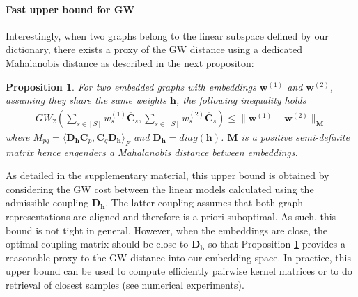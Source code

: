 \documentclass{article}
\newcommand{\scalar}[2]{\langle #1 , #2 \rangle}
\def\vh{{\bm{h}}}
\def\vw{{\bm{w}}}
\def\mC{{\bm{C}}}
\def\mD{{\bm{D}}}
\def\mM{{\bm{M}}}
\newtheorem{proposition}{Proposition}
\begin{document}
	\paragraph{Fast upper bound for GW} Interestingly, when two graphs belong to
	the linear subspace defined by our dictionary, there exists a proxy of the GW distance using a
	dedicated Mahalanobis distance as described in the next propositon: 
	\begin{proposition}
		\label{prop:embed_graph}
		For two embedded graphs with embeddings $\vw^{(1)}$ and $\vw^{(2)}$, assuming they share the same weights $\vh$, the following inequality holds
		\begin{align}GW_2\left(\sum_{s \in [S]} w^{(1)}_s \overline{\mC}_s, \sum_{s \in [S]} w^{(2)}_s \overline{\mC}_s\right) \leq \|\vw^{(1)} - \vw^{(2)}\|_\mM \label{eq:mah_gw}
		\end{align}
		where $M_{pq} = \scalar{\mD_{\vh}\overline{\mC}_p}{ \overline{\mC}_q\mD_{\vh}}_F$ and $\mD_\vh= diag(\vh)$. $\mM$ is a positive semi-definite matrix hence engenders a Mahalanobis distance between embeddings.
	\end{proposition}
	As detailed in the supplementary material, this upper bound is obtained by considering the GW cost between the linear models calculated using the admissible coupling $\mD_{\vh}$. The latter coupling assumes that both graph representations are aligned and therefore is a priori suboptimal. As such, this bound is not tight in general. However, when the embeddings are close, the optimal coupling matrix should be close to $\mD_{\vh}$ so that Proposition \ref{prop:embed_graph} provides a reasonable proxy to the GW distance into our embedding space. In practice, this upper bound can be used to compute efficiently pairwise kernel matrices or to do retrieval of closest samples (see numerical experiments).
	
\end{document}
